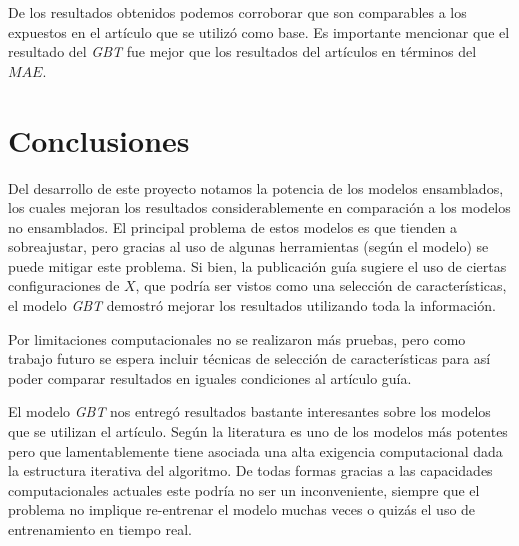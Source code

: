 \documentclass[spanish]{article}
\begin{document}
        De los resultados obtenidos podemos corroborar que son comparables a los expuestos en el 
        artículo que se utilizó como base. Es importante mencionar que el resultado del
        \emph{GBT} fue mejor que los resultados del artículos en términos del $MAE$.
  
    
    \section{Conclusiones}
        
      Del desarrollo de este proyecto notamos la potencia de los modelos ensamblados, los cuales
      mejoran los resultados considerablemente en comparación a los modelos no ensamblados. El principal
      problema de estos modelos es que tienden a sobreajustar, pero gracias al uso de algunas herramientas
      (según el modelo) se puede mitigar este problema. Si bien, la publicación guía sugiere el uso de 
      ciertas configuraciones de $X$, que podría ser vistos como una selección de características, el 
      modelo \emph{GBT} demostró mejorar los resultados utilizando toda la información. \medskip

      Por limitaciones computacionales no se realizaron más pruebas, pero como trabajo futuro
      se espera incluir técnicas de selección de características para así poder comparar resultados
      en iguales condiciones al artículo guía. \medskip

      El modelo \emph{GBT} nos entregó resultados bastante interesantes sobre los modelos que se utilizan 
      el artículo. Según la literatura es uno de los modelos más potentes pero que lamentablemente tiene 
      asociada una alta exigencia computacional dada la estructura iterativa del algoritmo. De todas 
      formas gracias a las capacidades computacionales actuales este podría no ser un inconveniente, 
      siempre que el problema no implique re-entrenar el modelo muchas veces o quizás el uso de 
      entrenamiento en tiempo real.

  
  
\end{document}

